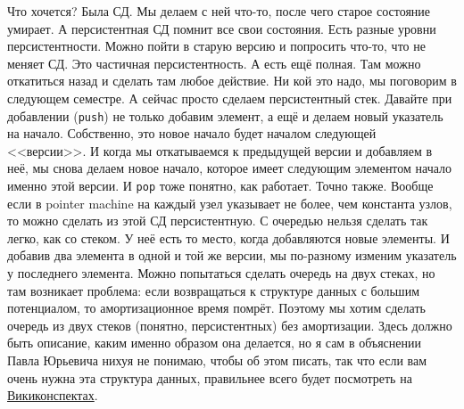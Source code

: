 \documentclass{article}
\newcommand{\pseudo}{PseudoLexer.py:PseudoLexer -x}
\newcommand{\pseudocode}[1]{\texttt{#1}}
\begin{document}
    Что хочется? Была СД. Мы делаем с ней что-то, после чего старое состояние умирает. А персистентная СД помнит все свои состояния. Есть разные уровни персистентности. Можно пойти в старую версию и попросить что-то, что не меняет СД. Это частичная персистентность. А есть ещё полная. Там можно откатиться назад и сделать там любое действие. Ни кой это надо, мы поговорим в следующем семестре. А сейчас просто сделаем персистентный стек. Давайте при добавлении (\pseudocode{push}) не только добавим элемент, а ещё и делаем новый указатель на начало. Собственно, это новое начало будет началом следующей <<версии>>. И когда мы откатываемся к предыдущей версии и добавляем в неё, мы снова делаем новое начало, которое имеет следующим элементом начало именно этой версии. И \pseudocode{pop} тоже понятно, как работает. Точно также. Вообще если в pointer machine на каждый узел указывает не более, чем константа узлов, то можно сделать из этой СД персистентную. С очередью нельзя сделать так легко, как со стеком. У неё есть то место, когда добавляются новые элементы. И добавив два элемента в одной и той же версии, мы по-разному изменим указатель у последнего элемента. Можно попытаться сделать очередь на двух стеках, но там возникает проблема: если возвращаться к структуре данных с большим потенциалом, то амортизационное время помрёт. Поэтому мы хотим сделать очередь из двух стеков (понятно, персистентных) без амортизации. Здесь должно быть описание, каким именно образом она делается, но я сам в объяснении Павла Юрьевича нихуя не понимаю, чтобы об этом писать, так что если вам очень нужна эта структура данных, правильнее всего будет посмотреть на \href{https://neerc.ifmo.ru/wiki/index.php?title=\%D0\%9F\%D0\%B5\%D1\%80\%D1\%81\%D0\%B8\%D1\%81\%D1\%82\%D0\%B5\%D0\%BD\%D1\%82\%D0\%BD\%D0\%B0\%D1\%8F_\%D0\%BE\%D1\%87\%D0\%B5\%D1\%80\%D0\%B5\%D0\%B4\%D1\%8C}{Викиконспектах}.
\end{document}
